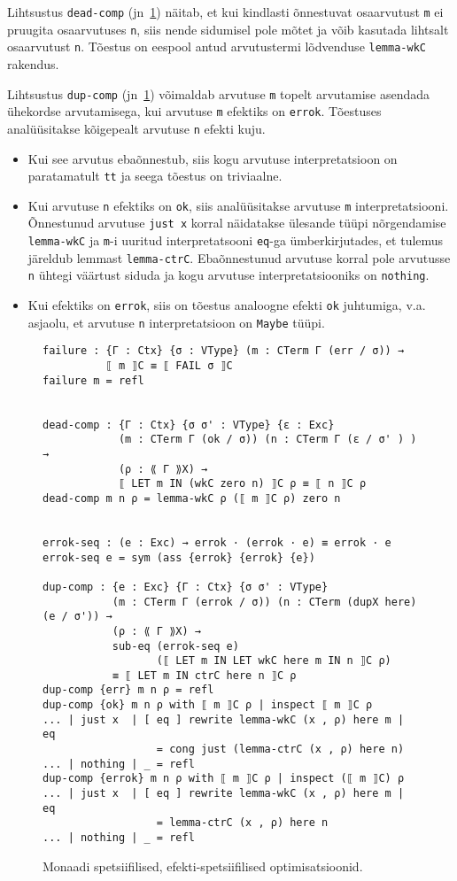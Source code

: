 \documentclass[a4paper,12pt]{article}
\begin{document}
Lihtsustus {\tt dead-comp} (jn~\ref{fig:exc.opt2}) näitab, et kui kindlasti õnnestuvat osaarvutust {\tt m} ei pruugita osaarvutuses {\tt n}, siis nende sidumisel pole mõtet ja võib kasutada lihtsalt osaarvutust {\tt n}. Tõestus on eespool antud arvutustermi lõdvenduse {\tt lemma-wkC} rakendus.

Lihtsustus {\tt dup-comp} (jn~\ref{fig:exc.opt2}) võimaldab arvutuse {\tt m} topelt arvutamise asendada ühekordse arvutamisega, kui arvutuse {\tt m} efektiks on {\tt errok}. Tõestuses analüüsitakse kõigepealt arvutuse {\tt n} efekti kuju.
\begin{itemize}
\item Kui see arvutus ebaõnnestub, siis kogu arvutuse interpretatsioon on paratamatult {\tt tt} ja seega tõestus on triviaalne.
\item Kui arvutuse {\tt n} efektiks on {\tt ok}, siis analüüsitakse arvutuse {\tt m} interpretatsiooni. Õnnestunud arvutuse {\tt just x} korral näidatakse ülesande tüüpi nõrgendamise {\tt lemma-wkC} ja {\tt m}-i uuritud interpretatsooni {\tt eq}-ga ümberkirjutades, et tulemus järeldub lemmast {\tt lemma-ctrC}. Ebaõnnestunud arvutuse korral pole arvutusse {\tt n} ühtegi väärtust siduda ja kogu arvutuse interpretatsiooniks on {\tt nothing}.
\item Kui efektiks on {\tt errok}, siis on tõestus analoogne efekti {\tt ok} juhtumiga, v.a. asjaolu, et arvutuse {\tt n} interpretatsioon on {\tt Maybe} tüüpi.
\end{itemize}

\begin{figure}
  \begin{BVerbatim}
failure : {Γ : Ctx} {σ : VType} (m : CTerm Γ (err / σ)) →
          ⟦ m ⟧C ≡ ⟦ FAIL σ ⟧C
failure m = refl


dead-comp : {Γ : Ctx} {σ σ' : VType} {ε : Exc}
            (m : CTerm Γ (ok / σ)) (n : CTerm Γ (ε / σ' ) ) →
            (ρ : ⟪ Γ ⟫X) → 
            ⟦ LET m IN (wkC zero n) ⟧C ρ ≡ ⟦ n ⟧C ρ
dead-comp m n ρ = lemma-wkC ρ (⟦ m ⟧C ρ) zero n


errok-seq : (e : Exc) → errok · (errok · e) ≡ errok · e
errok-seq e = sym (ass {errok} {errok} {e})

dup-comp : {e : Exc} {Γ : Ctx} {σ σ' : VType} 
           (m : CTerm Γ (errok / σ)) (n : CTerm (dupX here) (e / σ')) →
           (ρ : ⟪ Γ ⟫X) → 
           sub-eq (errok-seq e)
                  (⟦ LET m IN LET wkC here m IN n ⟧C ρ)
           ≡ ⟦ LET m IN ctrC here n ⟧C ρ
dup-comp {err} m n ρ = refl
dup-comp {ok} m n ρ with ⟦ m ⟧C ρ | inspect ⟦ m ⟧C ρ
... | just x  | [ eq ] rewrite lemma-wkC (x , ρ) here m | eq
                  = cong just (lemma-ctrC (x , ρ) here n)
... | nothing | _ = refl
dup-comp {errok} m n ρ with ⟦ m ⟧C ρ | inspect (⟦ m ⟧C) ρ 
... | just x  | [ eq ] rewrite lemma-wkC (x , ρ) here m | eq
                  = lemma-ctrC (x , ρ) here n
... | nothing | _ = refl
  \end{BVerbatim}
  \caption{Monaadi spetsiifilised, efekti-spetsiifilised optimisatsioonid.}
  \label{fig:exc.opt2}
\end{figure}
\end{document}
